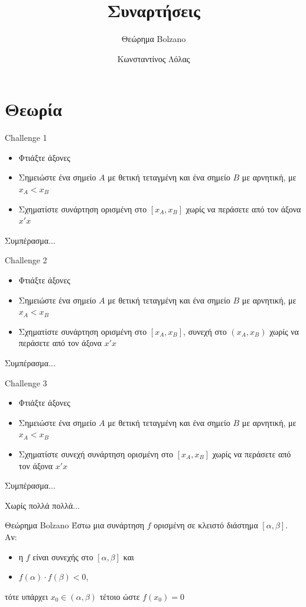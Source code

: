 \documentclass{presentation}
\title{Συναρτήσεις}
\subtitle{Θεώρημα Bolzano}
\author[Λόλας]{Κωνσταντίνος Λόλας}
\begin{document}
\begin{frame}
  \titlepage
\end{frame}

\section{Θεωρία}
\begin{frame}{Challenge 1}
  \begin{itemize}
    \item<1-> Φτιάξτε άξονες
    \item<2-> Σημειώστε ένα σημείο $Α$ με θετική τεταγμένη και ένα σημείο $Β$ με αρνητική, με $x_A<x_B$
    \item<3-> Σχηματίστε συνάρτηση ορισμένη στο $[x_A,x_B]$ χωρίς να περάσετε από τον άξονα $x'x$
  \end{itemize}
   Συμπέρασμα...
\end{frame}

\begin{frame}{Challenge 2}
  \begin{itemize}
    \item<1-> Φτιάξτε άξονες
    \item<2-> Σημειώστε ένα σημείο $Α$ με θετική τεταγμένη και ένα σημείο $Β$ με αρνητική, με $x_A<x_B$
    \item<3-> Σχηματίστε συνάρτηση ορισμένη στο $[x_A,x_B]$, συνεχή στο $(x_A,x_B)$ χωρίς να περάσετε από τον άξονα $x'x$
  \end{itemize}
   Συμπέρασμα...
\end{frame}

\begin{frame}{Challenge 3}
  \begin{itemize}
    \item<1-> Φτιάξτε άξονες
    \item<2-> Σημειώστε ένα σημείο $Α$ με θετική τεταγμένη και ένα σημείο $Β$ με αρνητική, με $x_A<x_B$
    \item<3-> Σχηματίστε συνεχή συνάρτηση ορισμένη στο $[x_A,x_B]$ χωρίς να περάσετε από τον άξονα $x'x$
  \end{itemize}
   Συμπέρασμα...
\end{frame}

\begin{frame}{Χωρίς πολλά πολλά...}
  \begin{block}{Θεώρημα Bolzano}
    Έστω μια συνάρτηση $f$ ορισμένη σε κλειστό διάστημα $[α,β]$. Αν:
    \begin{itemize}
      \item η $f$ είναι συνεχής στο $[α,β]$ και
      \item $f(α)\cdot f(β)<0$,
    \end{itemize}
    τότε υπάρχει $x_0\in (α,β)$ τέτοιο ώστε $f(x_0)=0$
  \end{block}
\end{frame}
\end{document}
